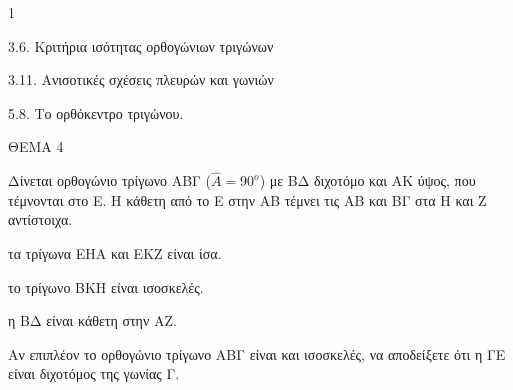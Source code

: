 \begin{ylh}{1}
    \item 3.6. Κριτήρια ισότητας ορθογώνιων τριγώνων
    \item 3.11. Ανισοτικές σχέσεις πλευρών και γωνιών
    \item 5.8. Το ορθόκεντρο τριγώνου.
\end{ylh}

ΘΕΜΑ 4

Δίνεται ορθογώνιο τρίγωνο ΑΒΓ ($\widehat{A} = 90^{o}$) με ΒΔ διχοτόμο και ΑΚ ύψος, που τέμνονται στο Ε. Η κάθετη από το Ε στην ΑΒ τέμνει τις ΑΒ και ΒΓ στα Η και Ζ αντίστοιχα.

\begin{alist}
\item Να αποδείξετε ότι:

.}
\end{alist}
\begin{alist}
\item
  τα τρίγωνα ΕΗΑ και ΕΚΖ είναι ίσα. 
\item
  το τρίγωνο ΒΚΗ είναι ισοσκελές. 
\item
  η ΒΔ είναι κάθετη στην ΑΖ. 

\item Αν επιπλέον το ορθογώνιο τρίγωνο ΑΒΓ είναι και ισοσκελές, να αποδείξετε ότι η ΓΕ είναι διχοτόμος της γωνίας Γ. 


\end{alist}
